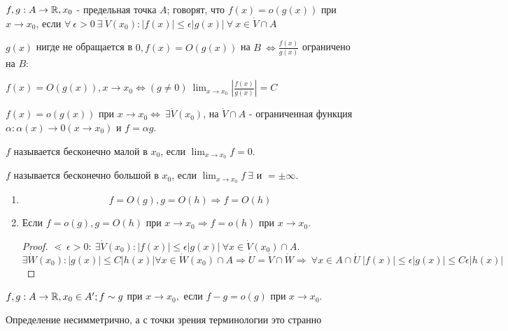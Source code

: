 \documentclass[12pt]{report}
\begin{document}
\begin{defn}
$f, g: A \to \mathbb{R}, x_0$ - предельная точка $A$; говорят, что $f(x) = o(g(x))$ при $x \to x_0$, если $\forall ~\epsilon > 0 ~\exists ~\dot V(x_0): |f(x)| \le \epsilon |g(x)| ~\forall ~x \in \dot V \cap A$
\end{defn}

\begin{st}
$g(x)$ нигде не обращается в $0, f(x) = O(g(x))$ на $B ~\Leftrightarrow \frac{f(x)}{g(x)}$ ограничено на $B$:

$f(x) = O(g(x)), x \to x_0 \Leftrightarrow (g \neq 0) ~\lim_{x \to x_0}{|\frac{f(x)}{g(x)}|} = C$
\end{st}

\begin{lm}
$f(x) = o(g(x))$ при $x \to x_0 \Leftrightarrow ~\exists \dot V(x_0)$, на $\dot V \cap A$ - ограниченная функция $\alpha: \alpha(x) \to 0 (x \to x_0)$ и $f = \alpha g$.
\end{lm}

\begin{defn}
$f$ называется бесконечно малой в $x_0$, если $\lim_{x \to x_0}{f} = 0$.

$f$ называется бесконечно большой в $x_0$, если $\lim_{x \to x_0}{f}  ~\exists$ и $= \pm \infty$.
\end{defn}

\begin{prop}
\begin{enumerate}
\item 
$$f = O(g), g = O(h) \Rightarrow f = O(h)$$
\item Если $f = o(g), g = O(h)$ при $x \to x_0 \Rightarrow f = o(h)$ при $x \to x_0$.
\begin{proof}
$\lessdot ~\epsilon > 0: ~\exists \dot V(x_0): |f(x)| \le \epsilon|g(x)| ~\forall x \in \dot V(x_0) \cap A$. $\exists \dot W(x_0): |g(x)| \le C|h(x)| \forall x \in \dot W(x_0) \cap A \Rightarrow \dot U = \dot V \cap \dot W \Rightarrow ~\forall x \in A \cap \dot U ~|f(x)| \le \epsilon|g(x)| \le C\epsilon |h(x)|$
\end{proof}
\end{enumerate}
\end{prop}

\begin{defn}
$f, g: A \to \mathbb{R}, x_0 \in A'; f \sim g$ при $x \to x_0,$ если $f - g = o(g)$ при $x \to x_0$.
\end{defn}

\begin{note}
Определение несимметрично, а с точки зрения терминологии это странно
\end{note}
\end{document}
